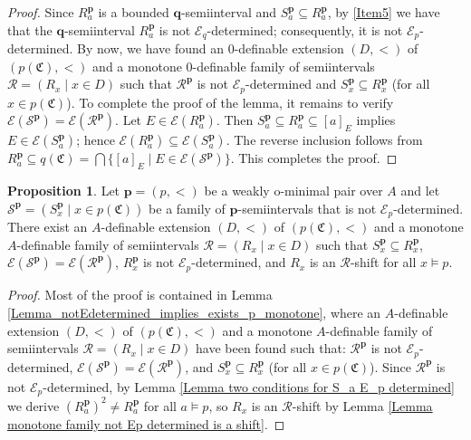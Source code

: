 \documentclass{amsart}
\theoremstyle{definition}
\newtheorem{Proposition}[Theorem]{Proposition}
\theoremstyle{definition}
\newcommand{\Mon}{\mathfrak C}
\def\pp{\mathbf{p}}
\begin{document}
\begin{proof}
\smallskip
Since $R^{\mathbf p}_a$ is a bounded $\mathbf q$-semiinterval and $S^{\mathbf p}_a\subseteq R^{\mathbf p}_a$, by \ref{Item5} we have that the $\mathbf q$-semiinterval $R^{\mathbf p}_a$ is not $\mathcal E_q$-determined; consequently, it is not $\mathcal E_p$-determined. By now, we have found an 0-definable extension $(D,<)$ of $(p(\Mon),<)$ and a monotone 0-definable family of semiintervals $\mathcal R=(R_x\mid x\in D)$ such that $\mathcal R^{\mathbf p}$ is not $\mathcal E_p$-determined and $S_x^{\mathbf p}\subseteq R^{\mathbf p}_x$ (for all $x\in p(\Mon)$). To complete the proof of the lemma, it remains to verify $\mathcal E(\mathcal S^{\mathbf p})=\mathcal E(\mathcal R^{\mathbf p})$. Let $E\in\mathcal E(R^{\mathbf p}_a)$. Then $S_a^{\mathbf p}\subseteq R^{\mathbf p}_a\subseteq [a]_E$ implies $E\in \mathcal E(S^{\mathbf p}_a)$; hence $\mathcal E(R^{\mathbf p}_a) \subseteq \mathcal E(S^{\mathbf p}_a)$. The reverse inclusion follows from $R^{\mathbf p}_a\subseteq q(\Mon)=\bigcap\{[a]_E\mid E\in \mathcal E (\mathcal S^{\mathbf p})\}$. This completes the proof.
\end{proof}
 


\begin{Proposition}\label{Prop_p_notssi_exists_shift}
Let $\mathbf p=(p,<)$ be a weakly o-minimal pair over $A$ and let $\mathcal S^{\mathbf p}=(S^\pp_x\mid x\in p(\Mon))$ be a family of $\mathbf p$-semiintervals that is not $\mathcal E_p$-determined. There exist an $A$-definable extension $(D,<)$ of $(p(\Mon),<)$ and a monotone $A$-definable family of semiintervals $\mathcal R=(R_x\mid x\in D)$ such that $S_x^{\mathbf p}\subseteq R^{\mathbf p}_x$, $\mathcal E(\mathcal S^{\mathbf p})=\mathcal E(\mathcal R^{\mathbf p})$, $R^{\mathbf p}_x$ is not $\mathcal E_p$-determined, and $R_x$ is an $\mathcal R$-shift for all $x\models p$.
\end{Proposition}
\begin{proof} 
Most of the proof is contained in Lemma \ref{Lemma_notEdetermined_implies_exists_p_monotone}, 
where an $A$-definable extension $(D,<)$ of $(p(\Mon),<)$ and a monotone $A$-definable family of semiintervals $\mathcal R=(R_x\mid x\in D)$ have been found such that: $\mathcal R^{\mathbf p}$ is not $\mathcal E_p$-determined, $\mathcal E(\mathcal S^{\mathbf p})=\mathcal E(\mathcal R^{\mathbf p})$, and $S_x^{\mathbf p}\subseteq R^{\mathbf p}_x$ (for all $x\in p(\Mon)$).
Since $\mathcal R^{\mathbf p}$ is not $\mathcal E_p$-determined, by Lemma \ref{Lemma two conditions for S_a E_p determined} we derive $(R^{\mathbf p}_a)^2\neq R^{\mathbf p}_a$ for all $a\models p$, so $R_x$ is an $\mathcal R$-shift by Lemma \ref{Lemma monotone family not Ep determined is a shift}.
\end{proof}
\end{document}
